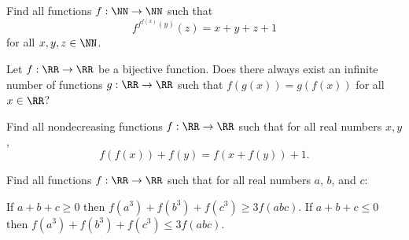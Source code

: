 \begin{probEG}[ELMO 2021/1]
	Find all functions $f:\NN\to\NN$ such that
	\[f^{f^{f(x)}(y)}(z)=x+y+z+1\]
	for all $x,y,z\in\NN$.
\end{probEG}

\begin{probEG}
	Let $f:\RR\to\RR$ be a bijective function. Does there always exist an infinite number of functions $g:\RR\to\RR$ such that $f(g(x))=g(f(x))$ for all $x\in\RR$?
\end{probEG}

\begin{probMG}
	Find all nondecreasing functions $f:\RR\to\RR$ such that for all real numbers $x,y$,
	\[f(f(x))+f(y)=f(x+f(y))+1.\]
\end{probMG}

\begin{probM}
	Find all functions $f:\RR\to\RR$ such that for all real numbers $a$, $b$, and $c$:
	\begin{enumerate}[(i)]
		\ii If $a+b+c\ge 0$ then $f(a^3)+f(b^3)+f(c^3)\ge 3f(abc).$
		\ii If $a+b+c\le 0$ then $f(a^3)+f(b^3)+f(c^3)\le 3f(abc).$
	\end{enumerate}
\end{probM}
